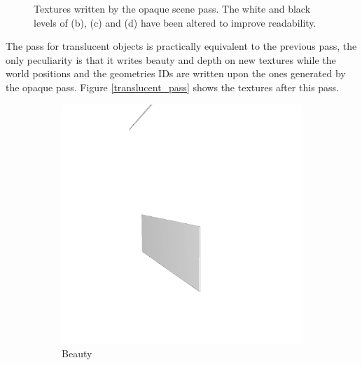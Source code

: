 \begin{figure}
	\caption{Textures written by the opaque scene pass. The white and black levels of (b), (c) and (d) have been altered to improve readability.}
	\label{opaque_pass}
\end{figure}

The pass for translucent objects is practically equivalent to the previous pass, the only peculiarity is that it writes beauty and depth on new textures while the world positions and the geometries IDs are written upon the ones generated by the opaque pass. Figure \ref{translucent_pass} shows the textures after this pass.

\begin{figure}
	\centering
	\begin{subfigure}[t]{0.24\linewidth}
		\includegraphics[width=\textwidth]{chapters/chapter_thetool/beauty_scenepass2}
		\caption{Beauty}
		\label{beauty_scenepass2}
	\end{subfigure}
	\begin{subfigure}[t]{0.24\linewidth}

\end{subfigure}
\end{figure}

